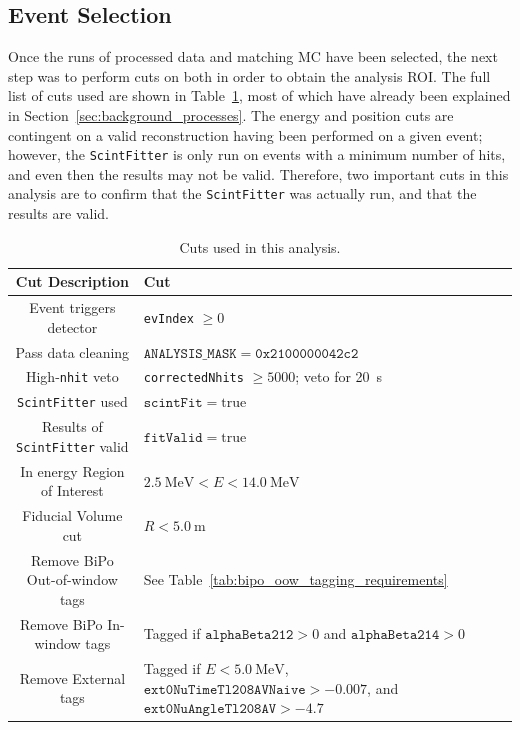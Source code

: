 \subsection{Event Selection}\label{sec:event_selection}
Once the runs of processed data and matching MC have been selected, the next step was to perform cuts on both in order to obtain the analysis ROI. The full list of cuts used are shown in Table~\ref{tab:ev_selection}, most of which have already been explained in Section~\ref{sec:background_processes}. The energy and position cuts are contingent on a valid reconstruction having been performed on a given event; however, the \texttt{ScintFitter} is only run on events with a minimum number of hits, and even then the results may not be valid. Therefore, two important cuts in this analysis are to confirm that the \texttt{ScintFitter} was actually run, and that the results are valid.

\begin{table}
    \centering
    \begin{tabular}{c >{\centering\arraybackslash}m{7.5 cm}}
        \hline
        Cut Description                        & Cut                      \\ \hline \hline
        Event triggers detector                & \texttt{evIndex} $\ge 0$ \\
        Pass data cleaning                     & $\mathtt{ANALYSIS\_MASK} = \mathtt{0x2100000042c2}$ \\
        High-\texttt{nhit} veto                & \texttt{correctedNhits} $\ge 5000$; veto for \SI{20}{s} \\
        \texttt{ScintFitter} used              & $\mathtt{scintFit} = \mathrm{true}$ \\
        Results of \texttt{ScintFitter} valid  & $\mathtt{fitValid} = \mathrm{true}$ \\
        In energy Region of Interest           & $\SI{2.5}{\MeV} < E < \SI{14.0}{\MeV}$ \\
        Fiducial Volume cut                    & $R < \SI{5.0}{\metre}$ \\
        Remove BiPo Out-of-window tags         & See Table~\ref{tab:bipo_oow_tagging_requirements} \\
        Remove BiPo In-window tags             & Tagged if $\mathtt{alphaBeta212} > 0$ and $\mathtt{alphaBeta214} > 0$ \\
        Remove External tags                   & Tagged if $E < \SI{5.0}{\MeV}$, $\mathtt{ext0NuTimeTl208AVNaive} > -0.007$, and $\mathtt{ext0NuAngleTl208AV} > -4.7$ \\
        \hline
    \end{tabular}
    \caption{Cuts used in this analysis.}
    \label{tab:ev_selection}
\end{table}

